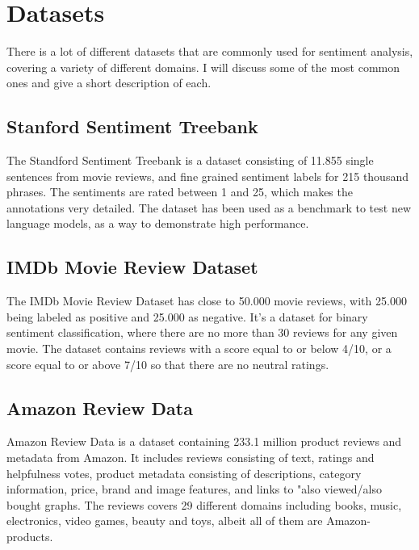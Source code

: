 \documentclass{report}
\begin{document}

\section{Datasets}
There is a lot of different datasets that are commonly used for sentiment analysis, covering a variety of different domains. I will discuss some of the most common ones and give a short description of each.
\subsection{Stanford Sentiment Treebank}
The Standford Sentiment Treebank is a dataset consisting of 11.855 single sentences from movie reviews, and fine grained sentiment labels for 215 thousand phrases. The sentiments are rated between 1 and 25, which makes the annotations very detailed. The dataset has been used as a benchmark to test new language models, as a way to demonstrate high performance.
\subsection{IMDb Movie Review Dataset}
The IMDb Movie Review Dataset has close to 50.000 movie reviews, with 25.000 being labeled as positive and 25.000 as negative. It's a dataset for binary sentiment classification, where there are no more than 30 reviews for any given movie. The dataset contains reviews with a score equal to or below 4/10, or a score equal to or above 7/10 so that there are no neutral ratings.
\subsection{Amazon Review Data}
Amazon Review Data is a dataset containing 233.1 million product reviews and metadata from Amazon. It includes reviews consisting of text, ratings and helpfulness votes, product metadata consisting of descriptions, category information, price, brand and image features, and links to "also viewed/also bought graphs. The reviews covers 29 different domains including books, music, electronics, video games, beauty and toys, albeit all of them are Amazon-products.
\end{document}
